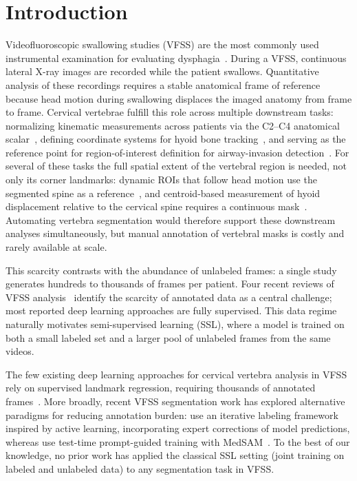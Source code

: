 \documentclass[a4paper,fleqn]{cas-dc}
\begin{document}
\maketitle

\section{Introduction}
\label{sec:intro}

Videofluoroscopic swallowing studies (VFSS) are the most commonly used instrumental examination for evaluating dysphagia~\citep{ref_logemann}.
During a VFSS, continuous lateral X-ray images are recorded while the patient swallows.
Quantitative analysis of these recordings requires a stable anatomical frame of reference because head motion during swallowing displaces the imaged anatomy from frame to frame.
Cervical vertebrae fulfill this role across multiple downstream tasks: normalizing kinematic measurements across patients via the C2--C4 anatomical scalar~\citep{ref_molfenter,ref_steele_norms}, defining coordinate systems for hyoid bone tracking~\citep{ref_kim2021}, and serving as the reference point for region-of-interest definition for airway-invasion detection~\citep{ref_lee2020}.
For several of these tasks the full spatial extent of the vertebral region is needed, not only its corner landmarks: dynamic ROIs that follow head motion use the segmented spine as a reference~\citep{ref_lee2020}, and centroid-based measurement of hyoid displacement relative to the cervical spine requires a continuous mask~\citep{ref_kim2021}.
Automating vertebra segmentation would therefore support these downstream analyses simultaneously, but manual annotation of vertebral masks is costly and rarely available at scale.

This scarcity contrasts with the abundance of unlabeled frames: a single study generates hundreds to thousands of frames per patient.
Four recent reviews of VFSS analysis~\citep{ref_girardi2023,ref_shu_review,ref_sanjeevi2025,ref_fakhry2025} identify the scarcity of annotated data as a central challenge; most reported deep learning approaches are fully supervised.
This data regime naturally motivates semi-supervised learning (SSL), where a model is trained on both a small labeled set and a larger pool of unlabeled frames from the same videos.

The few existing deep learning approaches for cervical vertebra analysis in VFSS rely on supervised landmark regression, requiring thousands of annotated frames~\citep{ref_zhang2021,ref_li2024}.
More broadly, recent VFSS segmentation work has explored alternative paradigms for reducing annotation burden: \citet{ref_cubero2025} use an iterative labeling framework inspired by active learning, incorporating expert corrections of model predictions, whereas \citet{ref_zeng_ttt} use test-time prompt-guided training with MedSAM~\citep{ref_medsam}.
To the best of our knowledge, no prior work has applied the classical SSL setting (joint training on labeled and unlabeled data) to any segmentation task in VFSS.
\end{document}
